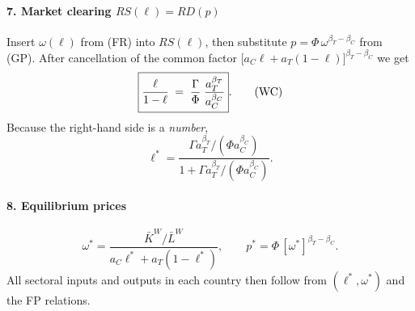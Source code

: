 \documentclass[11pt,letterpaper]{article}
\begin{document}
\paragraph{7.  Market clearing \(RS(\ell)=RD(p)\)}
Insert \(\omega(\ell)\) from (FR) into \(RS(\ell)\),
then substitute \(p=\Phi\,\omega^{\beta_T-\beta_C}\) from (GP).
After cancellation of the common factor
\(\bigl[a_C\ell+a_T(1-\ell)\bigr]^{\beta_T-\beta_C}\) we get
\[
\boxed{%
\frac{\ell}{1-\ell}
  \;=\;\frac{\Gamma}{\Phi}\;
       \frac{a_T^{\beta_T}}{a_C^{\beta_C}} }.
\tag{WC}
\]
Because the right-hand side is a \emph{number}, 
\[
\ell^\ast
  =\frac{ \Gamma a_T^{\beta_T}/( \Phi a_C^{\beta_C}) }
         { 1 + \Gamma a_T^{\beta_T}/( \Phi a_C^{\beta_C}) }.
\]

\paragraph{8.  Equilibrium prices}
\[
\omega^\ast
  =\frac{\bar K^W/\bar L^W}
         {a_C\ell^\ast+a_T(1-\ell^\ast)},
\qquad
p^\ast
  =\Phi\,[\omega^\ast]^{\beta_T-\beta_C}.
\]
All sectoral inputs and outputs in each country then follow from
\((\ell^\ast,\omega^\ast)\) and the FP relations.
\end{document}
